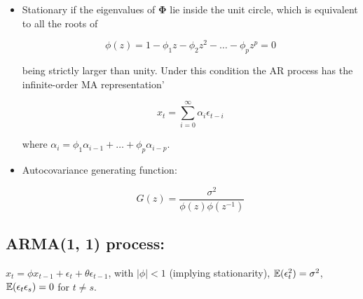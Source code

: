 \begin{itemize}

\item Stationary if the eigenvalues of \(\boldsymbol{\Phi}\) lie inside the unit circle, which is equivalent to all the roots of

\[
\phi(z) = 1 - \phi_1 z - \phi_2 z^2 - \ldots - \phi_p z^p = 0
\]

being strictly larger than unity. Under this condition the AR process has the infinite-order MA representation'

\[
x_t = \sum_{i=0}^\infty \alpha_i \epsilon_{t-i}
\]

where \(\alpha_i = \phi_1 \alpha_{i-1} + \ldots + \phi_p \alpha_{i - p}\).

\item Autocovariance generating function:

\[
G(z) = \frac{\sigma^2}{\phi(z) \phi(z^{-1})}
\]

\end{itemize}


\subsection{ARMA(1, 1) process:} \(x_t = \phi x_{t-1} + \epsilon_t + \theta \epsilon_{t-1}\), with \(|\phi| < 1\) (implying stationarity), \(\mathbb{E}(\epsilon_t^2) = \sigma^2\), \(\mathbb{E}(\epsilon_t \epsilon_s ) = 0 \) for \(t \neq s\).

